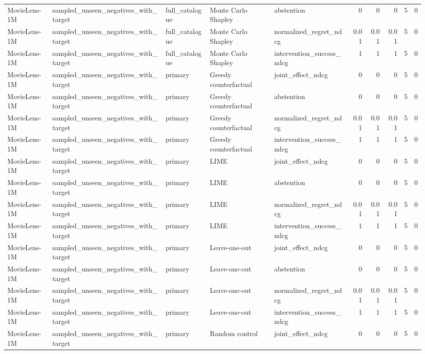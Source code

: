 \begin{table}[t]
{\begin{tabular}{lllllrrrrr}
MovieLens-1M & sampled\_unseen\_negatives\_with\_target & full\_catalogue & Monte Carlo Shapley & abstention & 0 & 0 & 0 & 5 & 0 \\
MovieLens-1M & sampled\_unseen\_negatives\_with\_target & full\_catalogue & Monte Carlo Shapley & normalized\_regret\_ndcg & 0.01 & 0.01 & 0.01 & 5 & 0 \\
MovieLens-1M & sampled\_unseen\_negatives\_with\_target & full\_catalogue & Monte Carlo Shapley & intervention\_success\_ndcg & 1 & 1 & 1 & 5 & 0 \\
MovieLens-1M & sampled\_unseen\_negatives\_with\_target & primary & Greedy counterfactual & joint\_effect\_ndcg & 0 & 0 & 0 & 5 & 0 \\
MovieLens-1M & sampled\_unseen\_negatives\_with\_target & primary & Greedy counterfactual & abstention & 0 & 0 & 0 & 5 & 0 \\
MovieLens-1M & sampled\_unseen\_negatives\_with\_target & primary & Greedy counterfactual & normalized\_regret\_ndcg & 0.01 & 0.01 & 0.01 & 5 & 0 \\
MovieLens-1M & sampled\_unseen\_negatives\_with\_target & primary & Greedy counterfactual & intervention\_success\_ndcg & 1 & 1 & 1 & 5 & 0 \\
MovieLens-1M & sampled\_unseen\_negatives\_with\_target & primary & LIME & joint\_effect\_ndcg & 0 & 0 & 0 & 5 & 0 \\
MovieLens-1M & sampled\_unseen\_negatives\_with\_target & primary & LIME & abstention & 0 & 0 & 0 & 5 & 0 \\
MovieLens-1M & sampled\_unseen\_negatives\_with\_target & primary & LIME & normalized\_regret\_ndcg & 0.01 & 0.01 & 0.01 & 5 & 0 \\
MovieLens-1M & sampled\_unseen\_negatives\_with\_target & primary & LIME & intervention\_success\_ndcg & 1 & 1 & 1 & 5 & 0 \\
MovieLens-1M & sampled\_unseen\_negatives\_with\_target & primary & Leave-one-out & joint\_effect\_ndcg & 0 & 0 & 0 & 5 & 0 \\
MovieLens-1M & sampled\_unseen\_negatives\_with\_target & primary & Leave-one-out & abstention & 0 & 0 & 0 & 5 & 0 \\
MovieLens-1M & sampled\_unseen\_negatives\_with\_target & primary & Leave-one-out & normalized\_regret\_ndcg & 0.01 & 0.01 & 0.01 & 5 & 0 \\
MovieLens-1M & sampled\_unseen\_negatives\_with\_target & primary & Leave-one-out & intervention\_success\_ndcg & 1 & 1 & 1 & 5 & 0 \\
MovieLens-1M & sampled\_unseen\_negatives\_with\_target & primary & Random control & joint\_effect\_ndcg & 0 & 0 & 0 & 5 & 0 \\

\end{tabular}}
\end{table}
